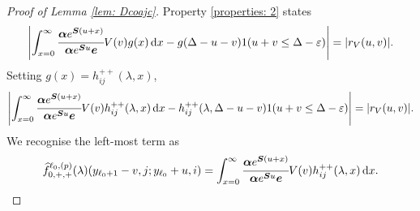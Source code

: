 \begin{proof}[Proof of Lemma \ref{lem: Dcoajc}]
                Property \ref{properties: 2} states
                \begin{align}
                	\left|\int_{x=0}^\infty \cfrac{\boldsymbol \alpha e^{\boldsymbol{S}(u+x)} }{\boldsymbol \alpha e^{\boldsymbol{S}u} \boldsymbol e} V(v)g(x)\, \mathrm{d} x -g(\Delta-u-v) 1(u+v\leq\Delta-\varepsilon)\right| =  |r_V(u,v)|.
                \end{align}
                Setting \(g(x) = h_{ij}^{++}(\lambda,x)\), 
                \begin{align}
                	\left|\int_{x=0}^\infty \cfrac{\boldsymbol \alpha e^{\boldsymbol{S}(u+x)} }{\boldsymbol \alpha e^{\boldsymbol{S}u} \boldsymbol e} V(v)h_{ij}^{++}(\lambda,x)\, \mathrm{d} x -h_{ij}^{++}(\lambda,\Delta-u-v) 1(u+v\leq\Delta-\varepsilon)\right| =  |r_V(u,v)|.
                \end{align}
                We recognise the left-most term as 
                \[\widehat f^{\ell_0,(p)}_{0,+,+}(\lambda)(y_{\ell_0+1}-v,j; y_{\ell_0}+u,i) = \int_{x=0}^\infty \cfrac{\boldsymbol \alpha e^{\boldsymbol{S}(u+x)} }{\boldsymbol \alpha e^{\boldsymbol{S}u} \boldsymbol e} V(v)h_{ij}^{++}(\lambda,x)\, \mathrm{d} x.\]
                

\end{proof}
